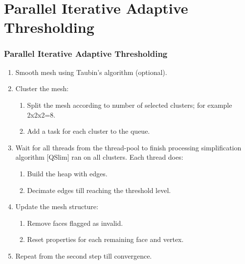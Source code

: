 \documentclass[
	10pt,
	t		%
]{beamer}
\begin{document}
\section{Parallel Iterative Adaptive Thresholding}
\begin{frame}
\frametitle{Parallel Iterative Adaptive Thresholding}
\centering
\begin{enumerate}
\item Smooth mesh using Taubin's algorithm (optional).
\color{gray}
\item Cluster the mesh:
\begin{enumerate}
\color{gray}
\item Split the mesh according to number of selected clusters; for example 2x2x2=8.
\item Add a task for each cluster to the queue.
\end{enumerate}
\item Wait for all threads from the thread-pool to finish processing simplification algorithm [QSlim] ran on all clusters. Each thread does:
\begin{enumerate}
\color{gray}
\item Build the heap with edges.
\item Decimate edges till reaching the threshold level.
\end{enumerate}
\item Update the mesh structure:
\begin{enumerate}
\color{gray}
\item Remove faces flagged as invalid.
\item Reset properties for each remaining face and vertex.
\end{enumerate}
\item Repeat from the second step till convergence.
\end{enumerate}
\end{frame}
\end{document}
